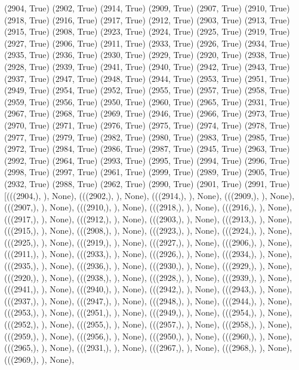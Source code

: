  (2904, True)
(2902, True)
(2914, True)
(2909, True)
(2907, True)
(2910, True)
(2918, True)
(2916, True)
(2917, True)
(2912, True)
(2903, True)
(2913, True)
(2915, True)
(2908, True)
(2923, True)
(2924, True)
(2925, True)
(2919, True)
(2927, True)
(2906, True)
(2911, True)
(2933, True)
(2926, True)
(2934, True)
(2935, True)
(2936, True)
(2930, True)
(2929, True)
(2920, True)
(2938, True)
(2928, True)
(2939, True)
(2941, True)
(2940, True)
(2942, True)
(2943, True)
(2937, True)
(2947, True)
(2948, True)
(2944, True)
(2953, True)
(2951, True)
(2949, True)
(2954, True)
(2952, True)
(2955, True)
(2957, True)
(2958, True)
(2959, True)
(2956, True)
(2950, True)
(2960, True)
(2965, True)
(2931, True)
(2967, True)
(2968, True)
(2969, True)
(2946, True)
(2966, True)
(2973, True)
(2970, True)
(2971, True)
(2976, True)
(2975, True)
(2974, True)
(2978, True)
(2977, True)
(2979, True)
(2982, True)
(2980, True)
(2983, True)
(2985, True)
(2972, True)
(2984, True)
(2986, True)
(2987, True)
(2945, True)
(2963, True)
(2992, True)
(2964, True)
(2993, True)
(2995, True)
(2994, True)
(2996, True)
(2998, True)
(2997, True)
(2961, True)
(2999, True)
(2989, True)
(2905, True)
(2932, True)
(2988, True)
(2962, True)
(2990, True)
(2901, True)
(2991, True)
[(((2904,), {}), None),
 (((2902,), {}), None),
 (((2914,), {}), None),
 (((2909,), {}), None),
 (((2907,), {}), None),
 (((2910,), {}), None),
 (((2918,), {}), None),
 (((2916,), {}), None),
 (((2917,), {}), None),
 (((2912,), {}), None),
 (((2903,), {}), None),
 (((2913,), {}), None),
 (((2915,), {}), None),
 (((2908,), {}), None),
 (((2923,), {}), None),
 (((2924,), {}), None),
 (((2925,), {}), None),
 (((2919,), {}), None),
 (((2927,), {}), None),
 (((2906,), {}), None),
 (((2911,), {}), None),
 (((2933,), {}), None),
 (((2926,), {}), None),
 (((2934,), {}), None),
 (((2935,), {}), None),
 (((2936,), {}), None),
 (((2930,), {}), None),
 (((2929,), {}), None),
 (((2920,), {}), None),
 (((2938,), {}), None),
 (((2928,), {}), None),
 (((2939,), {}), None),
 (((2941,), {}), None),
 (((2940,), {}), None),
 (((2942,), {}), None),
 (((2943,), {}), None),
 (((2937,), {}), None),
 (((2947,), {}), None),
 (((2948,), {}), None),
 (((2944,), {}), None),
 (((2953,), {}), None),
 (((2951,), {}), None),
 (((2949,), {}), None),
 (((2954,), {}), None),
 (((2952,), {}), None),
 (((2955,), {}), None),
 (((2957,), {}), None),
 (((2958,), {}), None),
 (((2959,), {}), None),
 (((2956,), {}), None),
 (((2950,), {}), None),
 (((2960,), {}), None),
 (((2965,), {}), None),
 (((2931,), {}), None),
 (((2967,), {}), None),
 (((2968,), {}), None),
 (((2969,), {}), None),
